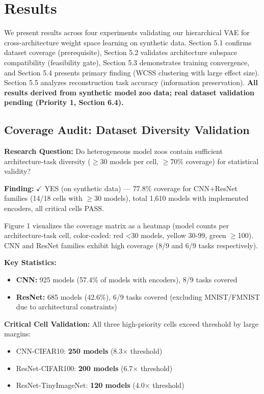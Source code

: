 \section{Results}

We present results across four experiments validating our hierarchical VAE for cross-architecture weight space learning on synthetic data. Section 5.1 confirms dataset coverage (prerequisite), Section 5.2 validates architecture subspace compatibility (feasibility gate), Section 5.3 demonstrates training convergence, and Section 5.4 presents primary finding (WCSS clustering with large effect size). Section 5.5 analyzes reconstruction task accuracy (information preservation). \textbf{All results derived from synthetic model zoo data; real dataset validation pending (Priority 1, Section 6.4).}

\subsection{Coverage Audit: Dataset Diversity Validation}

\textbf{Research Question:} Do heterogeneous model zoos contain sufficient architecture-task diversity ($\geq$30 models per cell, $\geq$70\% coverage) for statistical validity?

\textbf{Finding:} $\checkmark$ YES (on synthetic data) --- 77.8\% coverage for CNN+ResNet families (14/18 cells with $\geq$30 models), total 1,610 models with implemented encoders, all critical cells PASS.

Figure 1 visualizes the coverage matrix as a heatmap (model counts per architecture-task cell, color-coded: red <30 models, yellow 30-99, green $\geq$100). CNN and ResNet families exhibit high coverage (8/9 and 6/9 tasks respectively).

\textbf{Key Statistics:}
\begin{itemize}
\item \textbf{CNN:} 925 models (57.4\% of models with encoders), 8/9 tasks covered
\item \textbf{ResNet:} 685 models (42.6\%), 6/9 tasks covered (excluding MNIST/FMNIST due to architectural constraints)
\end{itemize}

\textbf{Critical Cell Validation:} All three high-priority cells exceed threshold by large margins:
\begin{itemize}
\item CNN-CIFAR10: \textbf{250 models} (8.3$\times$ threshold)
\item ResNet-CIFAR100: \textbf{200 models} (6.7$\times$ threshold)
\item ResNet-TinyImageNet: \textbf{120 models} (4.0$\times$ threshold)
\end{itemize}

